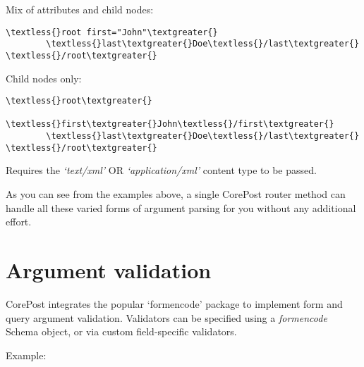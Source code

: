 \documentclass[letterpaper,10pt,english]{sphinxmanual}
\begin{document}
Mix of attributes and child nodes:

\begin{Verbatim}[commandchars=\\\{\}]
\textless{}root first="John"\textgreater{}
        \textless{}last\textgreater{}Doe\textless{}/last\textgreater{}
\textless{}/root\textgreater{}
\end{Verbatim}

Child nodes only:

\begin{Verbatim}[commandchars=\\\{\}]
\textless{}root\textgreater{}
        \textless{}first\textgreater{}John\textless{}/first\textgreater{}
        \textless{}last\textgreater{}Doe\textless{}/last\textgreater{}
\textless{}/root\textgreater{}
\end{Verbatim}

Requires the \emph{`text/xml'} OR \emph{`application/xml'} content type to be passed.

As you can see from the examples above, a single CorePost router method can handle all these varied forms of argument parsing
for you without any additional effort.


\section{Argument validation}
\label{arguments:argument-validation}\label{arguments::doc}
CorePost integrates the popular `formencode' package to implement form and query argument validation.
Validators can be specified using a \emph{formencode} Schema object, or via custom field-specific validators.

Example:
\end{document}
